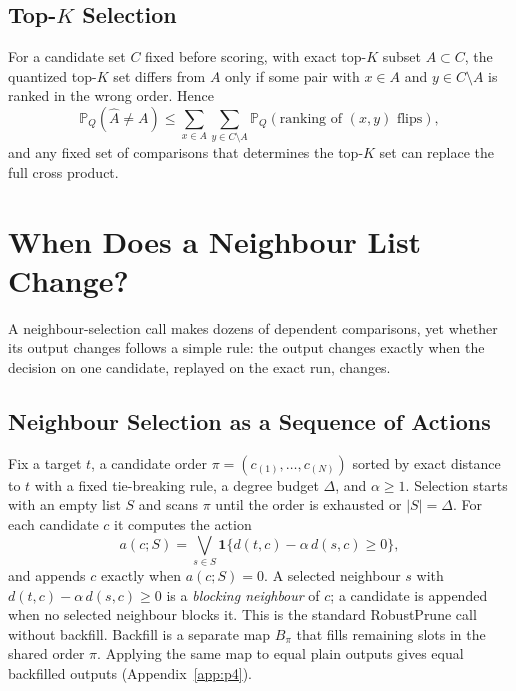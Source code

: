 \documentclass[twoside,11pt]{article}
\newcommand{\Pq}{\mathbb{P}_{Q}}
\begin{document}
\subsection{Top-$K$ Selection}
\label{sec:topk}

For a candidate set $C$ fixed before scoring, with exact top-$K$ subset $A\subset C$, the quantized top-$K$ set differs from $A$ only if some pair with $x\in A$ and $y\in C\setminus A$ is ranked in the wrong order. Hence
\begin{equation}
\Pq(\widehat A\ne A)\le\sum_{x\in A}\sum_{y\in C\setminus A}\Pq(\text{ranking of }(x,y)\text{ flips}),
\label{eq:topk-union}
\end{equation}
and any fixed set of comparisons that determines the top-$K$ set can replace the full cross product.

\section{When Does a Neighbour List Change?}
\label{sec:trace}

A neighbour-selection call makes dozens of dependent comparisons, yet whether its output changes follows a simple rule: the output changes exactly when the decision on one candidate, replayed on the exact run, changes.

\subsection{Neighbour Selection as a Sequence of Actions}
\label{sec:selection}

Fix a target $t$, a candidate order $\pi=(c_{(1)},\ldots,c_{(N)})$ sorted by exact distance to $t$ with a fixed tie-breaking rule, a degree budget $\Delta$, and $\alpha\ge1$. Selection starts with an empty list $S$ and scans $\pi$ until the order is exhausted or $|S|=\Delta$. For each candidate $c$ it computes the action
\begin{equation}
a(c;S)=\bigvee_{s\in S}\mathbf 1\{d(t,c)-\alpha\,d(s,c)\ge0\},
\end{equation}
and appends $c$ exactly when $a(c;S)=0$. A selected neighbour $s$ with $d(t,c)-\alpha\,d(s,c)\ge0$ is a \emph{blocking neighbour} of $c$; a candidate is appended when no selected neighbour blocks it. This is the standard RobustPrune call without backfill. Backfill is a separate map $B_\pi$ that fills remaining slots in the shared order $\pi$. Applying the same map to equal plain outputs gives equal backfilled outputs (Appendix~\ref{app:p4}).
\end{document}
